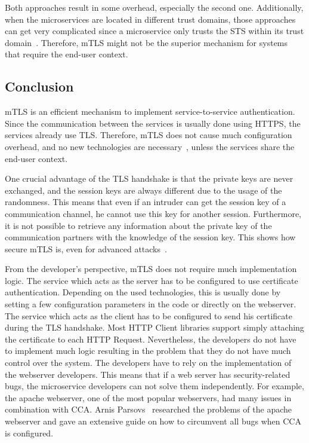 Both approaches result in some overhead, especially the second one.
Additionally, when the microservices are located in different trust domains, those approaches can get very complicated since a microservice only trusts the STS within its trust domain~\cite{dias2020microservices}.
Therefore, mTLS might not be the superior mechanism for systems that require the end-user context.

\subsection{Conclusion}
mTLS is an efficient mechanism to implement service-to-service authentication.
Since the communication between the services is usually done using HTTPS, the services already use TLS.
Therefore, mTLS does not cause much configuration overhead, and no new technologies are necessary~\cite{dias2020microservices}, unless the services share the end-user context.

One crucial advantage of the TLS handshake is that the private keys are never exchanged, and the session keys are always different due to the usage of the randomness.
This means that even if an intruder can get the session key of a communication channel, he cannot use this key for another session.
Furthermore, it is not possible to retrieve any information about the private key of the communication partners with the knowledge of the session key.
This shows how secure mTLS is, even for advanced attacks~\cite{parsovs2013practical}.

From the developer's perspective, mTLS does not require much implementation logic.
The service which acts as the server has to be configured to use certificate authentication.
Depending on the used technologies, this is usually done by setting a few configuration parameters in the code or directly on the webserver.
The service which acts as the client has to be configured to send his certificate during the TLS handshake.
Most HTTP Client libraries support simply attaching the certificate to each HTTP Request.
Nevertheless, the developers do not have to implement much logic resulting in the problem that they do not have much control over the system.
The developers have to rely on the implementation of the webserver developers.
This means that if a web server has security-related bugs, the microservice developers can not solve them independently.
For example, the apache webserver, one of the most popular webservers, had many issues in combination with CCA.
Arnis Parsovs~\cite{parsovs2013practical} researched the problems of the apache webserver and gave an extensive guide on how to circumvent all bugs when CCA is configured.

